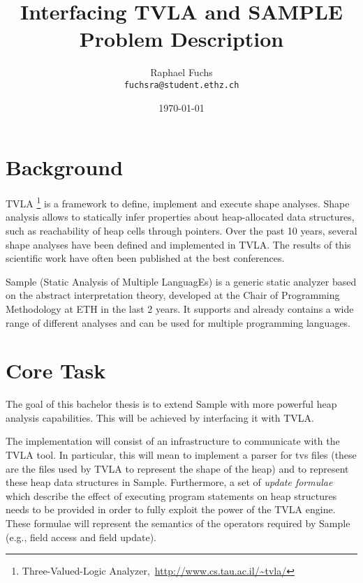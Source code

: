 \documentclass[12pt,a4paper]{article}
\begin{document}
\title{\bfseries \color{Heading} Interfacing TVLA and SAMPLE\\ \vspace{0.5cm}
  \Large{Problem Description}}
\author{Raphael Fuchs\\
  \texttt{fuchsra@student.ethz.ch}}
\date{\today}
\maketitle

\section*{Background}
TVLA \footnote{Three-Valued-Logic Analyzer,\, \url{http://www.cs.tau.ac.il/~tvla/}} is a framework to define, implement and execute shape analyses. Shape analysis allows to statically infer properties about heap-allocated data structures, such as reachability of heap cells through pointers. Over the past 10 years, several shape analyses have been defined and implemented in TVLA. The results of this scientific work have often been published at the best conferences. 

Sample (Static Analysis of Multiple LanguagEs) is a generic static analyzer based on the abstract interpretation theory, developed at the Chair of Programming Methodology at ETH in the last 2 years. It supports and already contains a wide range of different analyses and can be used for multiple programming languages. 

\section*{Core Task} 
The goal of this bachelor thesis is to extend Sample with more powerful heap analysis capabilities. This will be achieved by interfacing it with TVLA.

The implementation will consist of an infrastructure to communicate with the TVLA tool. In particular, this will mean to implement a parser for tvs files (these are the files used by TVLA to represent the shape of the heap) and to represent these heap data structures in Sample. Furthermore, a set of \textit{update formulae} which describe the effect of executing program statements on heap structures needs to be provided in order to fully exploit the power of the TVLA engine. These formulae will represent the semantics of the operators required by Sample (e.g., field access and field update).  
\end{document}
